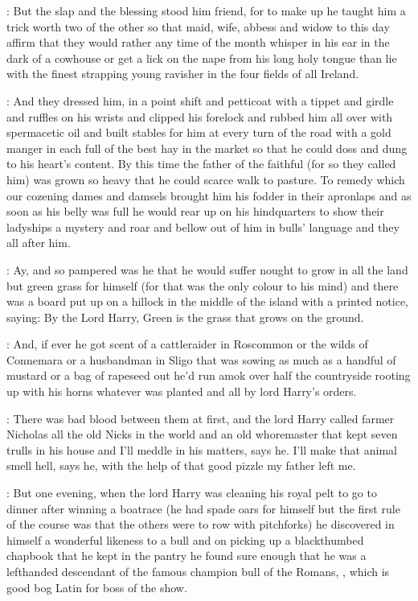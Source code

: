 \documentclass[12pt]{article}
\begin{document}
\Ly: But the slap and the blessing stood him friend, for to make up he
taught him a trick worth two of the other so that maid, wife, abbess and
widow to this day affirm that they would rather any time of the month
whisper in his ear in the dark of a cowhouse or get a lick on the nape
from his long holy tongue than lie with the finest strapping young
ravisher in the four fields of all Ireland.

\Md: And they dressed him, in a point shift and petticoat with a tippet
and girdle and ruffles on his wrists and clipped his forelock and rubbed
him all over with spermacetic oil and built stables for him at every turn
of the road with a gold manger in each full of the best hay in the market
so that he could doss and dung to his heart's content. By this time the
father of the faithful (for so they called him) was grown so heavy that he
could scarce walk to pasture. To remedy which our cozening dames and
damsels brought him his fodder in their apronlaps and as soon as his belly
was full he would rear up on his hindquarters to show their ladyships a
mystery and roar and bellow out of him in bulls' language and they all
after him.

\Ln: Ay, and so pampered was he that he would suffer nought to grow in all
the land but green grass for himself (for that was the only colour to his
mind) and there was a board put up on a hillock in the middle of the
island with a printed notice, saying: By the Lord Harry, Green is the
grass that grows on the ground.

\Dx: And, if ever he got scent of a cattleraider in Roscommon or the wilds
of Connemara or a husbandman in Sligo that was sowing as much as a handful
of mustard or a bag of rapeseed out he'd run amok over half the
countryside rooting up with his horns whatever was planted and all by lord
Harry's orders.

\Ly: There was bad blood between them at first,
and the lord Harry called farmer Nicholas all the old Nicks in
the world and an old whoremaster that kept seven trulls in his house and
I'll meddle in his matters, says he. I'll make that animal smell hell,
says he, with the help of that good pizzle my father left me.

\Dx: But one evening, when the lord Harry was cleaning his royal pelt to
go to dinner after winning a boatrace (he had spade oars for himself but
the first rule of the course was that the others were to row with
pitchforks) he discovered in himself a wonderful likeness to a bull and on
picking up a blackthumbed chapbook that he kept in the pantry he found
sure enough that he was a lefthanded descendant of the famous champion
bull of the Romans, , which is good bog Latin for boss of
the show.
\end{document}
